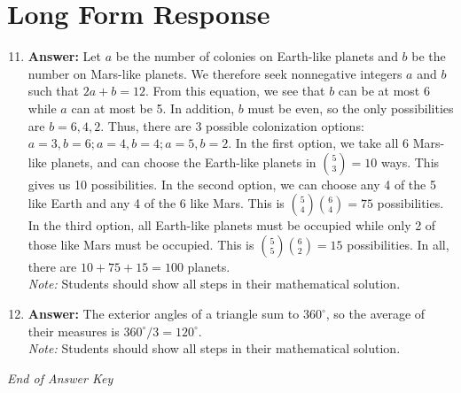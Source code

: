 \documentclass[12pt]{article}
\begin{document}
\section*{Long Form Response}
\begin{enumerate}[label=\arabic*.]
\setcounter{enumi}{10}
\item \textbf{Answer:} Let $a$ be the number of colonies on Earth-like planets and $b$ be the number on Mars-like planets. We therefore seek nonnegative integers $a$ and $b$ such that $2 a + b = 12$. From this equation, we see that $b$ can be at most 6 while $a$ can at most be 5. In addition, $b$ must be even, so the only possibilities are $b = 6, 4, 2$. Thus, there are 3 possible colonization options: $a = 3, b = 6; a=4, b = 4; a=5, b=2$. In the first option, we take all 6 Mars-like planets, and can choose the Earth-like planets in $\binom{5}{3} = 10$ ways. This gives us 10 possibilities. In the second option, we can choose any 4 of the 5 like Earth and any 4 of the 6 like Mars. This is $\binom{5}{4}\binom{6}{4} = 75$ possibilities. In the third option, all Earth-like planets must be occupied while only 2 of those like Mars must be occupied. This is $\binom{5}{5}\binom{6}{2} = 15$ possibilities. In all, there are $10 + 75 + 15 = \boxed{100}$ planets.
\\ \textit{Note:} Students should show all steps in their mathematical solution.
\item \textbf{Answer:} The exterior angles of a triangle sum to $360^\circ$, so the average of their measures is $360^\circ/3 = \boxed{120^\circ}$.
\\ \textit{Note:} Students should show all steps in their mathematical solution.
\end{enumerate}

\vfill
\noindent\textit{End of Answer Key}
\end{document}
